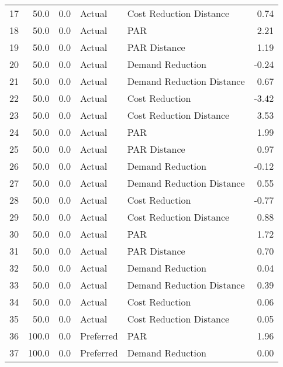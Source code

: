 \begin{longtable}{lrrllr}
17   &         50.0 &     0.0 &         Actual &    Cost Reduction Distance &   0.74 \\
18   &         50.0 &     0.0 &         Actual &                        PAR &   2.21 \\
19   &         50.0 &     0.0 &         Actual &               PAR Distance &   1.19 \\
20   &         50.0 &     0.0 &         Actual &           Demand Reduction &  -0.24 \\
21   &         50.0 &     0.0 &         Actual &  Demand Reduction Distance &   0.67 \\
22   &         50.0 &     0.0 &         Actual &             Cost Reduction &  -3.42 \\
23   &         50.0 &     0.0 &         Actual &    Cost Reduction Distance &   3.53 \\
24   &         50.0 &     0.0 &         Actual &                        PAR &   1.99 \\
25   &         50.0 &     0.0 &         Actual &               PAR Distance &   0.97 \\
26   &         50.0 &     0.0 &         Actual &           Demand Reduction &  -0.12 \\
27   &         50.0 &     0.0 &         Actual &  Demand Reduction Distance &   0.55 \\
28   &         50.0 &     0.0 &         Actual &             Cost Reduction &  -0.77 \\
29   &         50.0 &     0.0 &         Actual &    Cost Reduction Distance &   0.88 \\
30   &         50.0 &     0.0 &         Actual &                        PAR &   1.72 \\
31   &         50.0 &     0.0 &         Actual &               PAR Distance &   0.70 \\
32   &         50.0 &     0.0 &         Actual &           Demand Reduction &   0.04 \\
33   &         50.0 &     0.0 &         Actual &  Demand Reduction Distance &   0.39 \\
34   &         50.0 &     0.0 &         Actual &             Cost Reduction &   0.06 \\
35   &         50.0 &     0.0 &         Actual &    Cost Reduction Distance &   0.05 \\
36   &        100.0 &     0.0 &      Preferred &                        PAR &   1.96 \\
37   &        100.0 &     0.0 &      Preferred &           Demand Reduction &   0.00 \\

\end{longtable}
